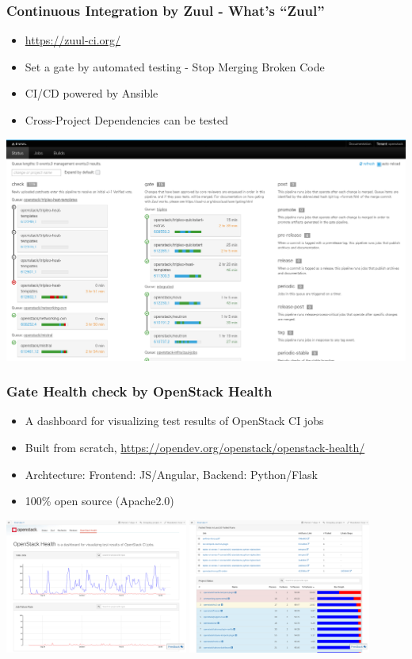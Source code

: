 \documentclass[aspectratio=169,11pt,hyperref={colorlinks=true}]{beamer}
\begin{document}
\begin{frame}
  \frametitle{Continuous Integration by Zuul - What's ``Zuul''}
  \begin{itemize}
    \item \url{https://zuul-ci.org/}
    \item Set a gate by automated testing - Stop Merging Broken Code    
    \item CI/CD powered by Ansible
    \item Cross-Project Dependencies can be tested
  \end{itemize}
  \centering\includegraphics[scale=0.2]{images/zuul-status.png}
\end{frame}

\begin{frame}
  \frametitle{Gate Health check by OpenStack Health}
  \begin{itemize}
    \item A dashboard for visualizing test results of OpenStack CI jobs
    \item Built from scratch, \url{https://opendev.org/openstack/openstack-health/}
    \item Archtecture: {Frontend: JS/Angular, Backend: Python/Flask}
    \item 100\% open source (Apache2.0)
  \end{itemize}
  \centering\includegraphics[width=60mm]{images/openstack-health1.png}
  \centering\includegraphics[width=60mm]{images/openstack-health2.png}
\end{frame}
\end{document}
